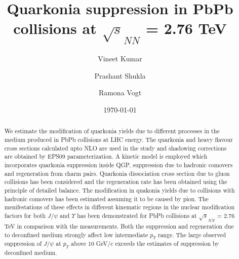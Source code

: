 \documentclass[aps,prc,preprint,superscriptaddress,showpacs,showkeys]{revtex4-1}
\begin{document}
\newcommand{\Jpsi}{J/\psi}
\newcommand{\pT}{p_{T}}

\title{{\Large Quarkonia suppression in PbPb collisions at $\sqrt s_{NN}$ =  2.76 TeV }}
\author{\large Vineet Kumar}
\author{\large Prashant Shukla}
\author{\large Ramona Vogt}
\date{\today}

\begin{abstract}
  We estimate the modification of quarkonia yields due to different processes 
in the medium produced in PbPb collisions at LHC energy. The quarkonia and heavy flavour 
cross sections calculated upto NLO are used in the study and shadowing corrections are obtained 
by EPS09 parameterization.
 A kinetic model is employed which incorporates quarkonia suppression inside QGP, suppression 
due to hadronic comovers and regeneration from charm pairs.
 Quarkonia dissociation cross section due to gluon collisions has been considered and
the regeneration rate has been obtained using the principle of detailed balance.
The modification in quakonia yields due to collisions with hadronic comovers has been estimated 
assuming it to be caused by pion.  
  The menifestations of these effects in different kinematic regions in
the nuclear modification factors for both $\Jpsi$ and $\Upsilon$ has been demonstrated
for PbPb collisions at $\sqrt s_{NN}$ =  2.76 TeV in comparison with the measurements.
  Both the suppression and regeneration due to deconfined medium strongly affect 
low intermediate $\pT$ range. The large observed suppression of $\Jpsi$ at $p_T$ 
above 10 GeV/$c$ exceeds the estimates of suppression by deconfined medium.
\end{abstract}

\maketitle

\end{document}
